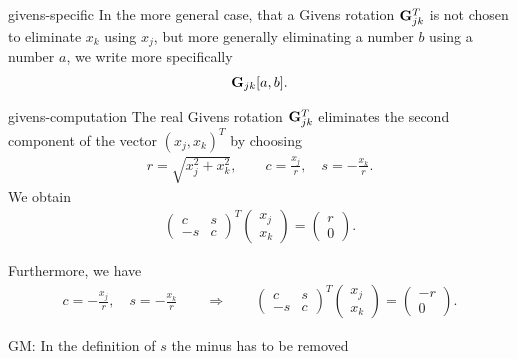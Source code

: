 \begin{Notation}{givens-specific}
  In the more general case, that a Givens rotation $\mathbf G_{jk}^T$ is
  not chosen to eliminate $x_k$ using $x_j$, but more generally
  eliminating a number $b$ using a number $a$, we write more
  specifically
  \begin{gather}
    \mathbf G_{jk}[a,b].
  \end{gather}
\end{Notation}

\begin{Lemma}{givens-computation}
  The real Givens rotation $\mathbf G_{jk}^T$ eliminates the second
  component of the vector $(x_j,x_k)^T$ by choosing
  \begin{gather}
    r = \sqrt{x_j^2+x_k^2},\qquad
    c = \frac{x_j}r,\quad s = -\frac{x_k}r.
  \end{gather}
  We obtain
  \begin{gather}
    \begin{pmatrix}
      c & s \\ -s & c
    \end{pmatrix}^T
    \begin{pmatrix}
      x_j\\x_k
    \end{pmatrix}
    =
    \begin{pmatrix}
      r\\0
    \end{pmatrix}
    .
  \end{gather}
\end{Lemma}
\begin{todo}
  Furthermore, we have
  \begin{gather}
    c = -\frac{x_j}r,\quad s = -\frac{x_k}r
    \qquad \Rightarrow \qquad
    \begin{pmatrix}
      c & s \\ -s & c
    \end{pmatrix}^T
    \begin{pmatrix}
      x_j\\x_k
    \end{pmatrix}
    =
    \begin{pmatrix}
      -r\\0
    \end{pmatrix}
    .
  \end{gather}
\end{todo}
\begin{todo}
  GM: In the definition of \(s\) the minus has to be removed
\end{todo}

